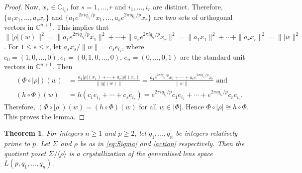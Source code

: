 \documentclass[12pt]{article}
\theoremstyle{theorem}
\newtheorem{theorem}{Theorem}[section]
\theoremstyle{definition}
\begin{document}
\begin{proof}
Now, $x_s\in \mathbb{C}_{i_s}$, for $s=1,\dots, r$ and $i_1, \dots, i_r$ are distinct. Therefore, $\{a_1x_1, \dots, a_sx_r\}$ and $\{a_1e^{2\pi iq_{i_1}/p} x_1, \dots, a_se^{2\pi iq_{i_r}/p}x_r\}$ are two sets of orthogonal vectors in $\mathbb{C}^{n + 1}$. This implies that $\||\rho|(w)\|^2 = \|a_1e^{2\pi iq_{i_1}/p} x_1\|^2 + \cdots + \|a_re^{2\pi iq_{i_r}/p}x_r\|^2 = \|a_1x_1\|^2 + \cdots + \|a_rx_r\|^2=\||w\|^2$. For $1\leq s\leq r$, let $a_sx_s/\|w\|= c_se_{i_s}$, where $e_0=(1, 0, \dots, 0), e_1=(0, 1, 0, \dots, 0)$, $e_n=(0, \dots, 0, 1)$ are the standard unit vectors in $\mathbb{C}^{n+1}$. Then 
\begin{align*}
(\Phi\circ|\rho|)(w) & = \frac{a_1|\rho|(x_1) + \cdots + a_r|\rho|(x_r)}{\||q|(w)\|} = \frac{a_1e^{2\pi iq_{i_1}/p} x_1+ \cdots + a_re^{2\pi iq_{i_r}/p}x_r}{\|w\|}  \mbox{ and} \\
(h\circ\Phi)(w)& = h(c_1e_{i_1}+\cdots+c_se_{i_s}) = e^{2\pi i q_{i_1}/p}c_1e_{i_1}+\cdots+ e^{2\pi i q_{i_r}/p}c_re_{i_r}. 
\end{align*}
Therefore, $(\Phi\circ|\rho|)(w)= (h\circ\Phi)(w)$ for all $w\in |\Phi|$. Hence $\Phi\circ|\rho| \cong h\circ\Phi$. This proves the lemma. 
\end{proof}



\begin{theorem}
For integers $n\geq 1$ and $p\geq 2$, let $q_1, \dots, q_n$ be integers relatively prime to  $p$. Let $\Sigma$ and $\rho$ be as in \eqref{eq:Sigma} and \eqref{action} respectively. Then  the quotient poset $\Sigma/\langle\rho\rangle$ is a crystallization of the generalised lens space $L(p, q_1, \dots, q_n)$. 
\end{theorem}
\end{document}
